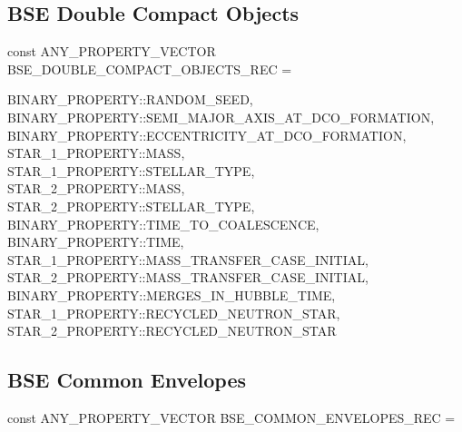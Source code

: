 \newpage
\subsection{BSE Double Compact Objects}\label{sec:BSEDoubleCompactObjects}

const ANY\_PROPERTY\_VECTOR BSE\_DOUBLE\_COMPACT\_OBJECTS\_REC = \lcb

\hfill
\begin{minipage}{\dimexpr\textwidth-2em}
    BINARY\_PROPERTY::RANDOM\_SEED, \\
    BINARY\_PROPERTY::SEMI\_MAJOR\_AXIS\_AT\_DCO\_FORMATION,  \\
    BINARY\_PROPERTY::ECCENTRICITY\_AT\_DCO\_FORMATION, \\
    STAR\_1\_PROPERTY::MASS, \\
    STAR\_1\_PROPERTY::STELLAR\_TYPE, \\
    STAR\_2\_PROPERTY::MASS,  \\
    STAR\_2\_PROPERTY::STELLAR\_TYPE, \\
    BINARY\_PROPERTY::TIME\_TO\_COALESCENCE, \\
    BINARY\_PROPERTY::TIME, \\
    STAR\_1\_PROPERTY::MASS\_TRANSFER\_CASE\_INITIAL, \\
    STAR\_2\_PROPERTY::MASS\_TRANSFER\_CASE\_INITIAL, \\
    BINARY\_PROPERTY::MERGES\_IN\_HUBBLE\_TIME, \\
    STAR\_1\_PROPERTY::RECYCLED\_NEUTRON\_STAR, \\
    STAR\_2\_PROPERTY::RECYCLED\_NEUTRON\_STAR
\end{minipage}
\par\rcb{;}

\newpage
\subsection{BSE Common Envelopes}\label{sec:BSECommonEnvelopes}

const ANY\_PROPERTY\_VECTOR BSE\_COMMON\_ENVELOPES\_REC = \lcb

